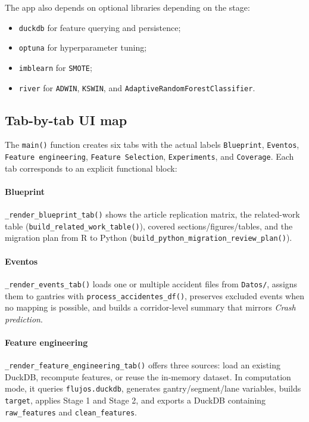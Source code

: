 The app also depends on optional libraries depending on the stage:
\begin{itemize}[leftmargin=*]
  \item \texttt{duckdb} for feature querying and persistence;
  \item \texttt{optuna} for hyperparameter tuning;
  \item \texttt{imblearn} for \texttt{SMOTE};
  \item \texttt{river} for \texttt{ADWIN}, \texttt{KSWIN}, and \texttt{AdaptiveRandomForestClassifier}.
\end{itemize}

\subsection{Tab-by-tab UI map}
The \texttt{main()} function creates six tabs with the actual labels \texttt{Blueprint}, \texttt{Eventos}, \texttt{Feature engineering}, \texttt{Feature Selection}, \texttt{Experiments}, and \texttt{Coverage}. Each tab corresponds to an explicit functional block:

\paragraph{Blueprint}
\texttt{\_render\_blueprint\_tab()} shows the article replication matrix, the related-work table (\texttt{build\_related\_work\_table()}), covered sections/figures/tables, and the migration plan from R to Python (\texttt{build\_python\_migration\_review\_plan()}).

\paragraph{Eventos}
\texttt{\_render\_events\_tab()} loads one or multiple accident files from \texttt{Datos/}, assigns them to gantries with \texttt{process\_accidentes\_df()}, preserves excluded events when no mapping is possible, and builds a corridor-level summary that mirrors \textit{Crash prediction}.

\paragraph{Feature engineering}
\texttt{\_render\_feature\_engineering\_tab()} offers three sources: load an existing DuckDB, recompute features, or reuse the in-memory dataset. In computation mode, it queries \texttt{flujos.duckdb}, generates gantry/segment/lane variables, builds \texttt{target}, applies Stage 1 and Stage 2, and exports a DuckDB containing \texttt{raw\_features} and \texttt{clean\_features}.

